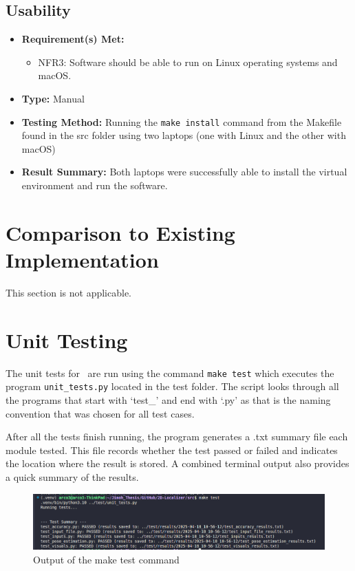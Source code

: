 \documentclass[12pt, titlepage]{article}
\begin{document}
\subsection{Usability}
\begin{itemize}
  \item \textbf{Requirement(s) Met: }
  \begin{itemize}
    \item NFR3: Software should be able to run on Linux operating systems and macOS.
  \end{itemize}
  \item \textbf{Type: }Manual
  \item \textbf{Testing Method: }Running the \texttt{make install} command from the Makefile found in the src folder using two laptops (one with Linux and the other with macOS)
  \item \textbf{Result Summary: }Both laptops were successfully able to install the virtual environment and run the software.
\end{itemize}
	
\section{Comparison to Existing Implementation}	

This section is not applicable.

\section{Unit Testing}

The unit tests for \progname~are run using the command \texttt{make\ test} which executes the program \texttt{unit\_tests.py} located in the test folder. The script looks through all the programs that start with `test\_' and end with `.py' as that is the naming convention that was chosen for all test cases. 

After all the tests finish running, the program generates a .txt summary file each module tested. This file records whether the test passed or failed and indicates the location where the result is stored. A combined terminal output also provides a quick summary of the results.

\begin{figure}[H]
  \centering
  \includegraphics[width=1\textwidth]{make_test.png}
  \caption{Output of the make test command}
\end{figure}
\end{document}
